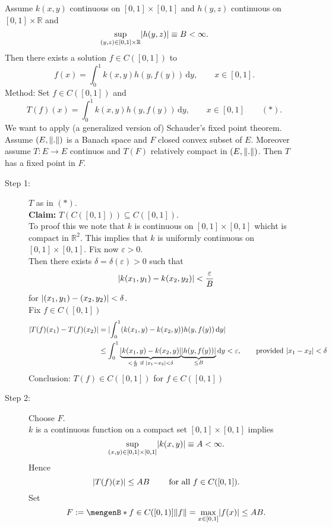 
\begin{beispiel}
	Assume $k(x,y)$ continuous on $[0,1] \times [0,1]$ and $h(y,z)$ continuous on $[0,1]\times \mathbb{R}$ and 
	\[
		\sup\limits_{(y,z) \in [0,1] \times \mathbb{R}} \lvert h(y,z)\rvert \equiv B < \infty.
	\]
	Then there exists a solution $f \in C([0,1])$ to 
	\[
		f(x) = \int_{0}^{1} k(x,y)h(y,f(y)) \,\mathrm{d}y, \qquad x \in [0,1].
	\]
	Method: Set $f \in C([0,1])$ and
	\[
		T(f)(x) = \int_{0}^{1}k(x,y)h(y,f(y)) \,\mathrm{d}y, \qquad x \in [0,1] \qquad (*).
	\]
	We want to apply (a generalized version of) Schauder's fixed point theorem. Assume $(E, \norm{.})$ is a Banach space and $F$ closed convex subset of $E$. Moreover assume $T: E \to E$ continuos and $T(F)$ relatively compact in $(E,\norm{.})$. Then $T$ has a fixed point in $F$. \\
	\begin{description}
		\item[Step 1:] $T$ as in $(*)$. \\
		\textbf{Claim:} \text{    }     $T(C([0,1])) \subseteq C([0,1])$. \\
		To proof this we note that $k$ is continuous on $[0,1] \times [0,1]$ whicht is compact in $\mathbb{R}^2$. This implies that $k$
 is uniformly continuous on $[0,1]\times [0,1]$. Fix now $\varepsilon >0$. \\
 Then there exists $\delta = \delta (\varepsilon) >0$ such that
 \[
 	\lvert k(x_1,y_1)- k(x_2,y_2)\rvert < \frac{\varepsilon}{B}
 \]
 for $\lvert(x_1,y_1)- (x_2,y_2)\rvert< \delta $. \\
 Fix $f \in C([0,1])$
 	\begin{align*}
 		\lvert T(f)(x_1)-T(f)(x_2)\rvert & = \lvert \int_{0}^{1}(k(x_1,y)-k(x_2,y))h(y,f(y)) \,\mathrm{d}y\rvert \\
		&\leq \int_{0}^{1}\underset{< \frac{\varepsilon}{B} \text{ if } \lvert x_1-x_2\rvert< \delta }{\underbrace{\lvert k(x_1,y)-k(x_2,y)\rvert}}\underset{\leq B}{\underbrace{\lvert h(y,f(y))\rvert}} \,\mathrm{d}y < \varepsilon, \qquad \text{provided }\lvert x_1-x_2\rvert< \delta
 	\end{align*}
	Conclusion: $T(f) \in C([0,1])$ for $f \in C([0,1])$
	\item[Step 2:] Choose $F$. \\
	$k$ is a continuous function on a compact set $[0,1] \times [0,1]$ implies
	\[
		\sup\limits_{(x,y) \in [0,1] \times [0,1]} \lvert k(x,y)\rvert \equiv A < \infty.
	\]
	Hence 
	\[
		\lvert T(f)(x)\rvert \leq  AB \qquad \text{ for all }f \in C([0,1]).
	\]
	Set 
	\[
		F:= \set[f \in C([0,1])]{\norm{f} = \max_{x \in [0,1]}\abs{f(x)} \leq AB}.
\]
\end{description}
\end{beispiel}
